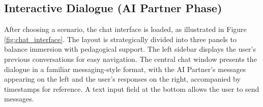

    \subsection{Interactive Dialogue (AI Partner Phase)}
    After choosing a scenario, the chat interface is loaded, as illustrated in Figure \ref{fig:chat_interface}. The layout is strategically divided into three panels to balance immersion with pedagogical support. The left sidebar displays the user's previous conversations for easy navigation. The central chat window presents the dialogue in a familiar messaging-style format, with the AI Partner's messages appearing on the left and the user's responses on the right, accompanied by timestamps for reference. A text input field at the bottom allows the user to send messages.
    
